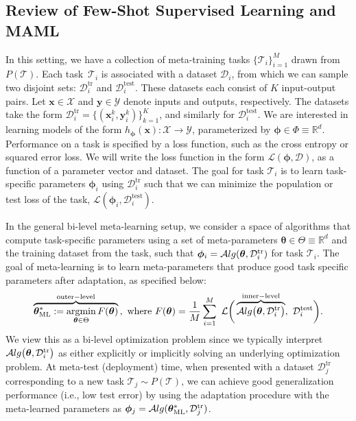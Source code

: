 \documentclass{article} \usepackage[nonatbib, final]{mod_neurips}
\newcommand{\task}{\mathcal{T}}
\newcommand{\data}{\mathcal{D}}
\newcommand{\inp}{\mathbf{x}}
\newcommand{\out}{\mathbf{y}}
\newcommand{\bR}{\mathbb{R}}
\DeclareMathOperator*{\argmin}{\mathrm{argmin}}
\newcommand{\param}{{\bm{\phi}}}               \newcommand{\paramspace}{\Phi}
\newcommand{\prior}{{\bm{\theta}}}               \newcommand{\priorspace}{\Theta}
\newcommand{\fn}{\mathcal{L}}                  \newcommand{\udfn}{\tilde{\fn}}        \newcommand{\fnht}{\hat{\fn}}        \newcommand{\ud}{\alg}
\newcommand{\datatr}{\data^{\mathrm{tr}}}
\newcommand{\datatest}{\data^{\mathrm{test}}}\clearpage{}
\begin{document}
\subsection{Review of Few-Shot Supervised Learning and MAML} 
In this setting, we have a collection of meta-training tasks $\{ \task_i \}_{i=1}^M$ drawn from $P(\task)$. Each task~$\task_i$ is associated with a dataset $\data_i$, from which we can sample two disjoint sets: $\datatr_i$ and $\datatest_i$. These datasets each consist of $K$ input-output pairs. Let $\inp \in \mathcal{X}$ and $\out \in \mathcal{Y}$ denote inputs and outputs, respectively. The datasets take the form $\datatr_i = \{ (\inp_i^k, \out_i^k) \}_{k=1}^{K}$, and similarly for $\datatest_i$. 
We are interested in learning models of the form $h_\param(\inp): \mathcal{X} \rightarrow \mathcal{Y}$, parameterized by $\param \in \paramspace \equiv \bR^d$.
Performance on a task is specified by a loss function, such as the cross entropy or squared error loss. We will write the loss function in the form $\fn(\param, \data)$, as a function of a parameter vector and dataset. The goal for task $\task_i$ is to learn task-specific parameters $\param_i$ using $\datatr_i$ such that we can minimize the population or test loss of the task, $\fn(\param_i, \datatest_i)$.

In the general bi-level meta-learning setup, we consider a space of algorithms that compute task-specific parameters using a set of meta-parameters $\prior \in \priorspace \equiv \bR^d$ and the training dataset from the task, such that $\param_i = \alg(\prior, \datatr_i)$ for task $\task_i$. The goal of meta-learning is to learn meta-parameters that produce good task specific parameters after adaptation, as specified below:
\begin{equation}
    \label{eq:objective}
    \overbrace{ \mlprior := \argmin_{\prior \in \priorspace} F(\prior)}^{\mathrm{outer-level}} \, , 
    \textrm{ where } F(\prior) 
    = \frac{1}{M} \sum_{i=1}^M \ \fn \bigg( \overbrace{ \alg \big( \prior, \datatr_i \big) }^{\mathrm{inner-level}}, \ \datatest_i \bigg).
  \end{equation}
We view this as a bi-level optimization problem since we typically interpret $\alg \big( \prior, \datatr_i \big)$ as either explicitly or implicitly solving an underlying optimization problem.
At meta-test (deployment) time, when presented with a dataset $\datatr_j$ corresponding to a new task $\task_j \sim P(\task)$, we can achieve good generalization performance (i.e., low test error) by using the adaptation procedure with the meta-learned parameters as $\param_j = \alg(\mlprior, \datatr_j)$.
\end{document}
